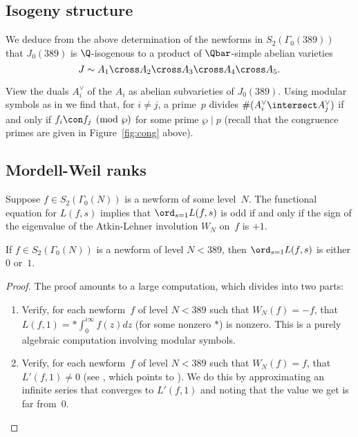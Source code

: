 \documentclass{report}
\begin{document}

\subsection{Isogeny structure}
We deduce from the above determination of the newforms in $S_2(\Gamma_0(389))$
that $J_0(389)$ is $\Q$-isogenous to a product of $\Qbar$-simple abelian varieties
$$
  J \sim A_1\cross A_2 \cross A_3 \cross A_4 \cross A_{5}.
$$

View the duals $A_i^{\vee}$ of the $A_i$ as abelian subvarieties of $J_0(389)$.
Using modular symbols as in \cite[\S3.4]{agashe-stein:bsd}
we find that, for $i\neq j$, a prime~$p$
divides $\#(A_i^{\vee}\intersect A_j^{\vee})$ if and only if $f_i\con f_j\pmod{\wp}$
for some prime $\wp\mid p$ (recall that the congruence primes
are given in Figure~\ref{fig:cong} above).


\subsection{Mordell-Weil ranks}\label{sec:mwranks}
Suppose $f\in S_2(\Gamma_0(N))$ is a newform of some level~$N$.
The functional equation for $L(f,s)$ implies that $\ord_{s=1}L(f,s)$
is odd if and only if the sign of the eigenvalue of the Atkin-Lehner
involution $W_N$ on~$f$ is $+1$.
\begin{proposition}\label{prop:minanrank}
If $f\in S_2(\Gamma_0(N))$ is a newform of level $N<389$, then
$\ord_{s=1}L(f,s)$ is either$0$ or~$1$.
\end{proposition}
\begin{proof}
The proof amounts to a large computation, which divides into two parts:
\begin{enumerate}
\item Verify, for each newform~$f$ of level $N<389$ such that
$W_N(f) = -f$, that $L(f,1) = *\int_{0}^{i\infty} f(z) dz$ (for some nonzero $*$)
is nonzero.  This is a purely algebraic computation involving modular symbols.
\item Verify, for each newform~$f$ of level $N<389$ such that
$W_N(f) = f$, that $L'(f,1)\neq 0$ (see \cite[\S4.1]{empirical},
which points to \cite[\S2.11,\S2.13]{cremona:algs}).
We do this by approximating an infinite
series that converges to $L'(f,1)$ and noting that the value we
get is far from~$0$.
\end{enumerate}
\end{proof}
\end{document}
